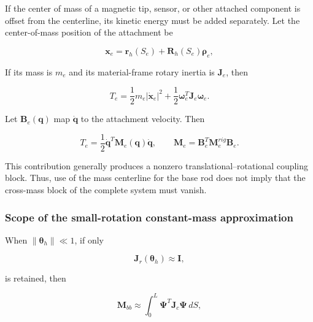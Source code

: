 If the center of mass of a magnetic tip, sensor, or other attached component is offset from the centerline, its kinetic energy must be added separately. Let the center-of-mass position of the attachment be

\begin{equation}
\label{eq:galerkin-2-48}
\mathbf{x}_{e} = \mathbf{r}_{h}\left( S_{e} \right) + \mathbf{R}_{h}\left( S_{e} \right)\bm{\rho}_{e},
\end{equation}

If its mass is \(m_{e}\) and its material-frame rotary inertia is \(\mathbf{J}_{e}\), then

\begin{equation}
\label{eq:galerkin-2-49}
T_{e} = \frac{1}{2}m_{e}\left| {\dot{\mathbf{x}}}_{e} \right|^{2} + \frac{1}{2}\bm{\omega}_{e}^{T}\mathbf{J}_{e}\bm{\omega}_{e}.
\end{equation}

Let \(\mathbf{B}_{e}\left( \mathbf{q} \right)\) map \(\dot{\mathbf{q}}\) to the attachment velocity. Then

\begin{equation}
\label{eq:galerkin-2-50}
T_{e} = \frac{1}{2}{\dot{\mathbf{q}}}^{T}\mathbf{M}_{e}\left( \mathbf{q} \right)\dot{\mathbf{q}},\quad\quad\mathbf{M}_{e} = \mathbf{B}_{e}^{T}\mathbf{M}_{e}^{rig}\mathbf{B}_{e}.
\end{equation}

This contribution generally produces a nonzero translational--rotational coupling block. Thus, use of the mass centerline for the base rod does not imply that the cross-mass block of the complete system must vanish.

\subsubsection{Scope of the small-rotation constant-mass approximation}\label{sec:galerkin-2-4-5}

When \(\parallel \bm{\theta}_{h} \parallel \ll 1\), if only

\begin{equation}
\label{eq:galerkin-2-51}
\mathbf{J}_{r}\left( \bm{\theta}_{h} \right) \approx \mathbf{I},
\end{equation}

is retained, then

\begin{equation}
\label{eq:galerkin-2-52}
\mathbf{M}_{bb} \approx \int_{0}^{L}\bm{\Psi}^{T}\mathbf{J}_{c}\bm{\Psi}\, dS,
\end{equation}

